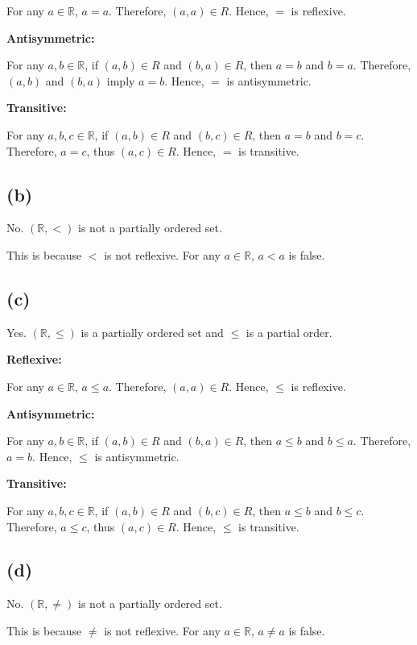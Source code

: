 \documentclass[a4paper,12pt]{article}
\begin{document}
For any $a \in \mathbb{R}$, $a = a$.
Therefore, $(a, a) \in R$.
Hence, $=$ is reflexive.

\textbf{Antisymmetric:}

For any $a, b \in \mathbb{R}$, if $(a, b) \in R$ and $(b, a) \in R$, then $a = b$ and $b = a$.
Therefore, $(a, b)$ and $(b, a)$ imply $a = b$.
Hence, $=$ is antisymmetric.

\textbf{Transitive:}

For any $a, b, c \in \mathbb{R}$, if $(a, b) \in R$ and $(b, c) \in R$, then $a = b$ and $b = c$.
Therefore, $a = c$, thus $(a, c) \in R$.
Hence, $=$ is transitive.

\subsection*{(b)}

No.
$(\mathbb{R}, <)$ is not a partially ordered set.

This is because $<$ is not reflexive.
For any $a \in \mathbb{R}$, $a < a$ is false.

\subsection*{(c)}

Yes.
$(\mathbb{R}, \leq)$ is a partially ordered set and $\leq$ is a partial order.

\textbf{Reflexive:}

For any $a \in \mathbb{R}$, $a \leq a$.
Therefore, $(a, a) \in R$.
Hence, $\leq$ is reflexive.

\textbf{Antisymmetric:}

For any $a, b \in \mathbb{R}$, if $(a, b) \in R$ and $(b, a) \in R$, then $a \leq b$ and $b \leq a$.
Therefore, $a = b$.
Hence, $\leq$ is antisymmetric.

\textbf{Transitive:}

For any $a, b, c \in \mathbb{R}$, if $(a, b) \in R$ and $(b, c) \in R$, then $a \leq b$ and $b \leq c$.
Therefore, $a \leq c$, thus $(a, c) \in R$.
Hence, $\leq$ is transitive.

\subsection*{(d)}

No.
$(\mathbb{R}, \neq)$ is not a partially ordered set.

This is because $\neq$ is not reflexive.
For any $a \in \mathbb{R}$, $a \neq a$ is false.
\end{document}
